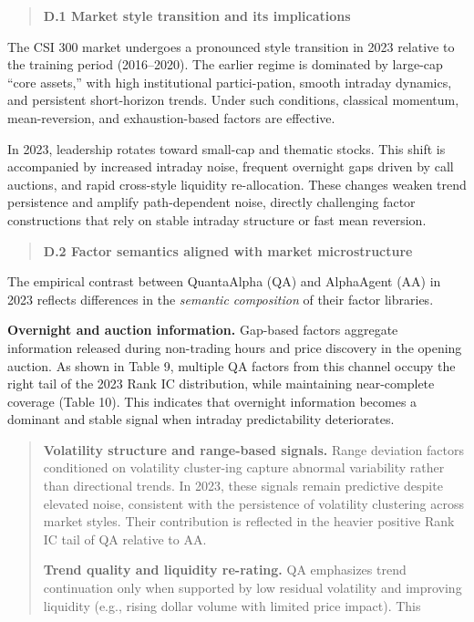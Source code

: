 \documentclass[
]{article}
\begin{document}
\begin{quote}
\textbf{D.1 Market style transition and its implications}
\end{quote}

The CSI 300 market undergoes a pronounced style transition in 2023
relative to the training period (2016--2020). The earlier regime is
dominated by large-cap ``core assets,'' with high institutional
partici-pation, smooth intraday dynamics, and persistent short-horizon
trends. Under such conditions, classical momentum, mean-reversion, and
exhaustion-based factors are effective.

In 2023, leadership rotates toward small-cap and thematic stocks. This
shift is accompanied by increased intraday noise, frequent overnight
gaps driven by call auctions, and rapid cross-style liquidity
re-allocation. These changes weaken trend persistence and amplify
path-dependent noise, directly challenging factor constructions that
rely on stable intraday structure or fast mean reversion.

\begin{quote}
\textbf{D.2 Factor semantics aligned with market microstructure}
\end{quote}

The empirical contrast between QuantaAlpha (QA) and AlphaAgent (AA) in
2023 reflects differences in the \emph{semantic composition} of their
factor libraries.

\textbf{Overnight and auction information.} Gap-based factors aggregate
information released during non-trading hours and price discovery in the
opening auction. As shown in Table 9, multiple QA factors from this
channel occupy the right tail of the 2023 Rank IC distribution, while
maintaining near-complete coverage (Table 10). This indicates that
overnight information becomes a dominant and stable signal when intraday
predictability deteriorates.

\begin{quote}
\textbf{Volatility structure and range-based signals.} Range deviation
factors conditioned on volatility cluster-ing capture abnormal
variability rather than directional trends. In 2023, these signals
remain predictive despite elevated noise, consistent with the
persistence of volatility clustering across market styles. Their
contribution is reflected in the heavier positive Rank IC tail of QA
relative to AA.

\textbf{Trend quality and liquidity re-rating.} QA emphasizes trend
continuation only when supported by low residual volatility and
improving liquidity (e.g., rising dollar volume with limited price
impact). This
\end{quote}
\end{document}
